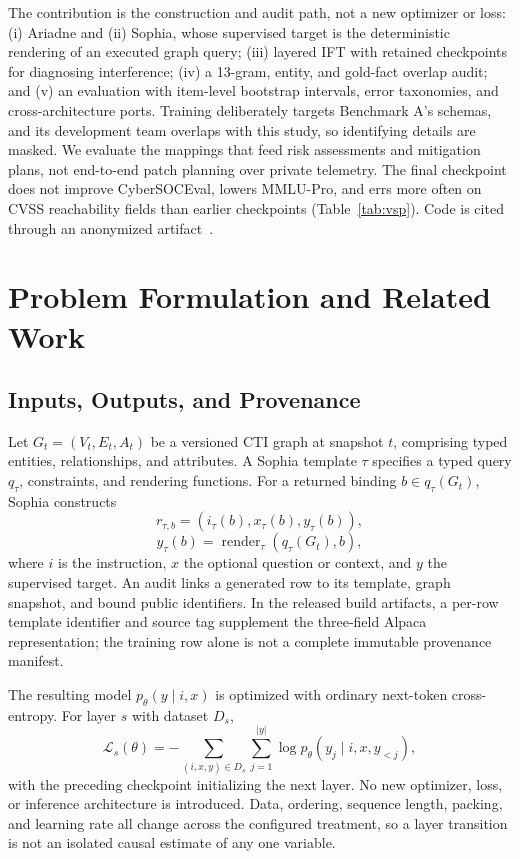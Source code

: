 \documentclass[conference]{IEEEtran}
\begin{document}
The contribution is the construction and audit path, not a new optimizer or loss: (i) Ariadne and (ii) Sophia, whose supervised target is the deterministic rendering of an executed graph query; (iii) layered IFT with retained checkpoints for diagnosing interference; (iv) a 13-gram, entity, and gold-fact overlap audit; and (v) an evaluation with item-level bootstrap intervals, error taxonomies, and cross-architecture ports. Training deliberately targets Benchmark A's schemas, and its development team overlaps with this study, so identifying details are masked. We evaluate the mappings that feed risk assessments and mitigation plans, not end-to-end patch planning over private telemetry. The final checkpoint does not improve CyberSOCEval, lowers MMLU-Pro, and errs more often on CVSS reachability fields than earlier checkpoints (Table~\ref{tab:vsp}). Code is cited through an anonymized artifact~\cite{anonartifact}.

\section{Problem Formulation and Related Work}
\subsection{Inputs, Outputs, and Provenance}
Let $G_t=(V_t,E_t,A_t)$ be a versioned CTI graph at snapshot $t$, comprising typed entities, relationships, and attributes. A Sophia template $\tau$ specifies a typed query $q_\tau$, constraints, and rendering functions. For a returned binding $b\in q_\tau(G_t)$, Sophia constructs
\begin{equation}
 r_{\tau,b}=\left(i_\tau(b),x_\tau(b),y_\tau(b)\right),
\end{equation}
\begin{equation}
 y_\tau(b)=\operatorname{render}_\tau\left(q_\tau(G_t),b\right),
\end{equation}
where $i$ is the instruction, $x$ the optional question or context, and $y$ the supervised target. An audit links a generated row to its template, graph snapshot, and bound public identifiers. In the released build artifacts, a per-row template identifier and source tag supplement the three-field Alpaca representation; the training row alone is not a complete immutable provenance manifest.

The resulting model $p_\theta(y\mid i,x)$ is optimized with ordinary next-token cross-entropy. For layer $s$ with dataset $D_s$,
\begin{equation}
 \mathcal{L}_s(\theta)=-\sum_{(i,x,y)\in D_s}\sum_{j=1}^{|y|}\log p_\theta(y_j\mid i,x,y_{<j}),
\end{equation}
with the preceding checkpoint initializing the next layer. No new optimizer, loss, or inference architecture is introduced. Data, ordering, sequence length, packing, and learning rate all change across the configured treatment, so a layer transition is not an isolated causal estimate of any one variable.
\end{document}
